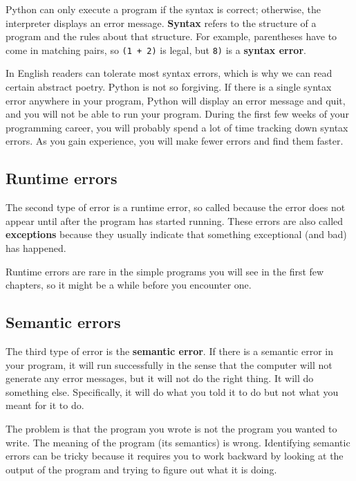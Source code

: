 \documentclass[10pt]{book}
\begin{document}
Python can only execute a program if the syntax is
correct; otherwise, the interpreter displays an error message.
{\bf Syntax} refers to the structure of a program and the rules about
that structure.  
For example, parentheses have to come in matching pairs, so
{\tt (1 + 2)} is legal, but {\tt 8)} is a {\bf syntax error}.


In English readers can tolerate most syntax errors, which is why we
can read certain abstract poetry.
Python is not so forgiving.  If there is a single syntax error
anywhere in your program, Python will display an error message and quit,
and you will not be able to run your program. During the first few
weeks of your programming career, you will probably spend a lot of
time tracking down syntax errors.  As you gain experience, you will
make fewer errors and find them faster.

\subsection{Runtime errors}
\label{runtime}

The second type of error is a runtime error, so called because the
error does not appear until after the program has started running.
These errors are also called {\bf exceptions} because they usually
indicate that something exceptional (and bad) has happened.

Runtime errors are rare in the simple programs you will see in the
first few chapters, so it might be a while before you encounter one.


\subsection{Semantic errors}

The third type of error is the {\bf semantic error}.  If there is a
semantic error in your program, it will run successfully in the sense
that the computer will not generate any error messages, but it will
not do the right thing.  It will do something else.  Specifically, it
will do what you told it to do but not what you meant for it to do.

The problem is that the program you wrote is not the program you
wanted to write.  The meaning of the program (its semantics) is wrong.
Identifying semantic errors can be tricky because it requires you to work
backward by looking at the output of the program and trying to figure
out what it is doing.
\end{document}
